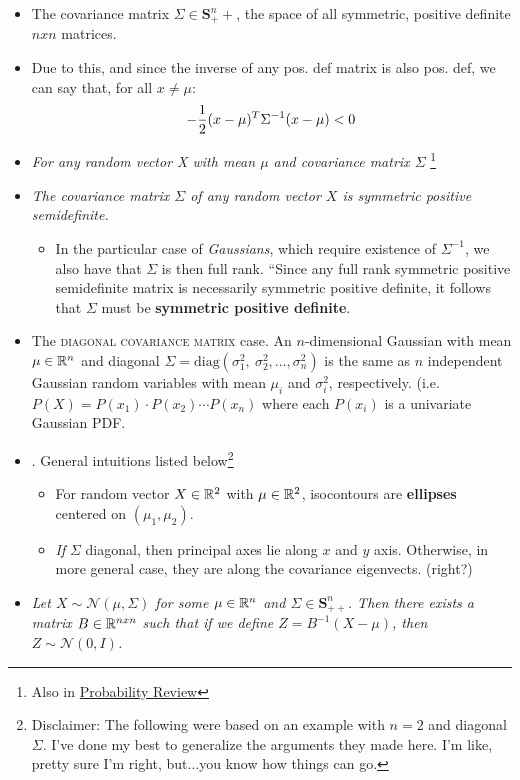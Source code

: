 \documentclass[12pt]{article}
\renewcommand{\matr}[1]{\mathbf{#1}}
\begin{document}
\begin{itemize}
	\item The covariance matrix $\Sigma \in \matr{S}^n_++$, the space of all symmetric, positive definite $n x n$ matrices. 
	
	\item Due to this, and since the inverse of any pos. def matrix is also pos. def, we can say that, for all $x \ne \mu$:
	\begin{align}
	-\frac{1}{2} (x - \mu)^T \Sigma^{-1} (x - \mu) < 0
	\end{align}
	
	\item \Theorem \textit{For any random vector X with mean $\mu$ and covariance matrix $\Sigma$} \footnote{Also in \hyperref[Probability Review]{Probability Review}}
	
	\item \Theorem \textit{The covariance matrix $\Sigma$ of any random vector $X$ is symmetric positive semidefinite.}
	\begin{itemize}
		\item In the particular case of \emph{Gaussians}, which require existence of $\Sigma^{-1}$, we also have that $\Sigma$ is then full rank. ``Since any full rank symmetric positive semidefinite matrix is necessarily symmetric positive definite, it follows that $\Sigma$ must be \textbf{symmetric positive definite}. 
	\end{itemize}
	
	\item The \textsc{diagonal covariance matrix} case. An $n$-dimensional Gaussian with mean $\mu \in \mathbb{R}^n$ and diagonal $\Sigma = \text{diag}(\sigma_1^2, ~ \sigma_2^2, \ldots, \sigma_n^2)$ is the same as $n$ independent Gaussian random variables with mean $\mu_i$ and $\sigma_i^2$, respectively. (i.e. $P(X) = P(x_1) \cdot P(x_2) \cdots P(x_n)$ where each $P(x_i)$ is a univariate Gaussian PDF. 
	
	\item {}. General intuitions listed below\footnote{Disclaimer: The following were based on an example with $n = 2$ and diagonal $\Sigma$. I've done my best to generalize the arguments they made here. I'm like, pretty sure I'm right, but...you know how things can go.}
	\begin{itemize}
		\item For random vector $X \in \mathbb{R}^2$ with $\mu \in \mathbb{R}^2$, isocontours are \textbf{ellipses} centered on $(\mu_1, \mu_2)$. 
		\item \textit{If} $\Sigma$ diagonal, then principal axes lie along $x$ and $y$ axis. Otherwise, in more general case, they are along the covariance eigenvects. (right?)
	\end{itemize}
	
	\item \Theorem \textit{Let $X \sim \mathcal{N}(\mu, \Sigma)$ for some $\mu \in \mathbb{R}^n$ and $\Sigma \in \matr{S}_{++}^n$. Then there exists a matrix $B \in \mathbb{R}^{n x n}$ such that if we define $Z = B^{-1} (X - \mu)$, then $Z \sim \mathcal{N}(0, I)$.}
\end{itemize}
\end{document}
